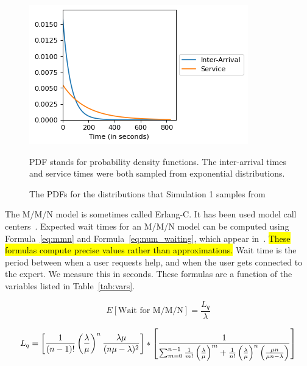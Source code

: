\begin{figure}[h]
  \includegraphics{figures/montecarlo/expon_expon.png}
  \begin{captiontext}
    PDF stands for probability density functions.
    The inter-arrival times and service times were both sampled from
    exponential distributions.
  \end{captiontext}
  \caption{
    The PDFs for the distributions that Simulation 1 samples from
  }\label{fig:simple_sim1_dists}
\end{figure}

The M/M/N model is sometimes called Erlang-C.
It has been used model call centers~\cite{queue1}.
Expected wait times for an M/M/N model can be computed using
Formula~\ref{eq:mmn} and Formula~\ref{eq:num_waiting}, which appear
in~\cite{mmn_formula}.
\hl{
  These formulas compute precise values rather than approximations.
}
Wait time is the period between when a user requests help, and when the user
gets connected to the expert.
We measure this in seconds.
These formulas are a function of the variables listed in Table~\ref{tab:vars}.

\begin{equation}
  E[\text{Wait for M/M/N}] = \frac{L_q}{\lambda}
  \label{eq:mmn}
\end{equation}

\begin{equation}
  L_q = \left[ \frac{1}{(n - 1)!} \left( \frac{\lambda}{\mu} \right)^n
    \frac{\lambda \mu}{(n \mu - \lambda)^2} \right] *
  \left[ \frac{1}{\sum_{m=0}^{n-1} \frac{1}{m!} \left( \frac{\lambda}{\mu}
      \right)^m + \frac{1}{n!} \left( \frac{\lambda}{\mu} \right)^n
    \left( \frac{\mu n}{\mu n - \lambda} \right) } \right]
\label{eq:num_waiting}
\vspace{0.4in}
\end{equation}

